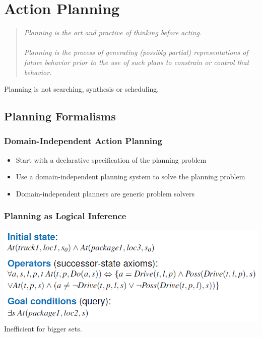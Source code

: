 \documentclass{article}
\begin{document}
\section{Action Planning}
\begin{quote}
\textit{Planning is the art and practive of thinking before acting.\\\\
Planning is the process of generating (possibly partial) representations of future behavior prior to the use of such plans to constrain or control that behavior.}
\end{quote}
Planning is not searching, synthesis or scheduling.
\subsection{Planning Formalisms}
\subsubsection{Domain-Independent Action Planning}
\begin{itemize}
\item Start with a declarative specification of the planning problem
\item Use a domain-independent planning system to solve the planning problem
\item Domain-independent planners are generic problem solvers
\end{itemize}
\subsubsection{Planning as Logical Inference}
\includegraphics[scale=0.6]{48.png}\\
Inefficient for bigger sets.
\end{document}
